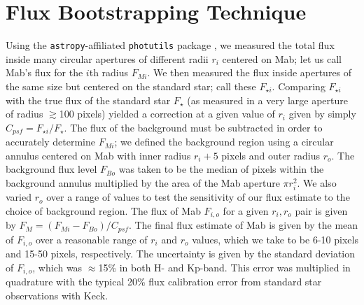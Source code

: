 \documentclass[preprint]{aastex631}
\begin{document}
\section{Flux Bootstrapping Technique}
\label{s:bootstrapping}

Using the \texttt{astropy}-affiliated \texttt{photutils} package \citep{photutils140}, we measured the total flux inside many circular apertures of different radii $r_i$ centered on Mab; let us call Mab's flux for the $i$th radius $F_{M i}$. We then measured the flux inside apertures of the same size but centered on the standard star; call these $F_{\star i}$. Comparing $F_{\star i}$ with the true flux of the standard star $F_\star$ (as measured in a very large aperture of radius $\gtrsim$100 pixels) yielded a correction at a given value of $r_{i}$ given by simply $C_{psf} = F_{\star i}/F_\star$. The flux of the background must be subtracted in order to accurately determine $F_{M i}$; we defined the background region using a circular annulus centered on Mab with inner radius $r_i + 5$ pixels and outer radius $r_o$. The background flux level $F_{B o}$ was taken to be the median of pixels within the background annulus multiplied by the area of the Mab aperture $\pi r_i^2$. We also varied $r_o$ over a range of values to test the sensitivity of our flux estimate to the choice of background region. The flux of Mab $F_{i,o}$ for a given $r_i, r_o$ pair is given by $F_M = (F_{M i} - F_{B o}) / C_{psf}$.
The final flux estimate of Mab is given by the mean of $F_{i,o}$ over a reasonable range of $r_i$ and $r_o$ values, which we take to be 6-10 pixels and 15-50 pixels, respectively. The uncertainty is given by the standard deviation of $F_{i,o}$, which was $\approx$15\% in both H- and Kp-band. This error was multiplied in quadrature with the typical 20\% flux calibration error from standard star observations with Keck.

\end{document}
